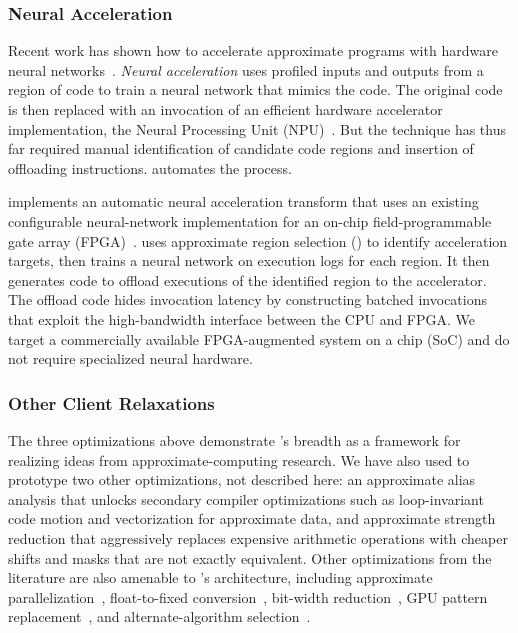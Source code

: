 \subsubsection{Neural Acceleration}
\label{accept:sec:npu}

Recent work has shown how to accelerate approximate programs with hardware
neural networks~\cite{benchnn, temam-isca, temam-isca13}.
\textit{Neural acceleration} uses profiled inputs and outputs from a region of
code to train a neural network that mimics the code.
The original code is then replaced with an invocation of an
efficient hardware accelerator implementation, the Neural Processing Unit
(NPU)~\cite{npu, anpu, snnap}.
But the technique has thus far required manual identification of candidate
code regions and insertion of offloading instructions.
\sysname automates the process.

\sysname implements an automatic neural acceleration transform
that uses an existing configurable neural-network implementation
for an on-chip field-programmable gate array (FPGA)~\cite{snnap}.
\sysname uses approximate region selection () to
identify acceleration targets, then trains a neural network on
execution logs for each region.
It then generates code to offload executions of the identified region to the
accelerator.
The offload code hides invocation latency by constructing batched invocations
that exploit the high-bandwidth interface between the CPU and FPGA.
We target a commercially available FPGA-augmented system on a chip (SoC) and
do not require specialized neural hardware.

\subsubsection{Other Client Relaxations}
The three optimizations above demonstrate \sysname's breadth as a
framework for realizing ideas from approximate-computing research.
We have also used \sysname to prototype
two other optimizations, not described here:
an approximate alias analysis that unlocks secondary compiler optimizations such as
loop-invariant code motion and vectorization for approximate data, and
approximate strength reduction that aggressively replaces expensive arithmetic
operations with cheaper shifts and masks that are not exactly equivalent.
Other optimizations from the literature are also amenable to \sysname's
architecture, including approximate parallelization~\cite{quickstep},
float-to-fixed conversion~\cite{torftf},
bit-width reduction~\cite{bitwidthred, precimonious}, GPU pattern replacement~\cite{paraprox},
and alternate-algorithm selection~\cite{green, petabricks}.
